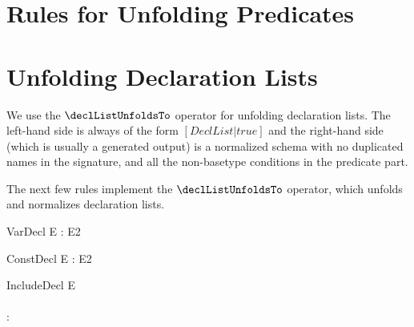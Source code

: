 \documentclass{article}
\begin{document}
\section{Rules for Unfolding Predicates}



\section{Unfolding Declaration Lists}

We use the $\declListUnfoldsTo$ operator for unfolding declaration
lists.   The left-hand side is always of the form $[DeclList|true]$
and the right-hand side (which is usually a generated output) is
a normalized schema with no duplicated names in the signature, and
all the non-basetype conditions in the predicate part.

The next few rules implement the $\declListUnfoldsTo$ operator,
which unfolds and normalizes declaration lists.

\begin{zedrule}{VarDecl}
   \proviso E : \power E2 \\
   [D1 | true] \declListUnfoldsTo [D2 | P2]
\derives
   [v:E; D1 | true] \declListUnfoldsTo [v:E2; D2 |  v \in E \land P2]
\end{zedrule}

\begin{zedrule}{ConstDecl}
   \proviso E : E2 \\
   [D1 | true] \declListUnfoldsTo [D2 | P2]
\derives
   [v==E; D1 | true] \declListUnfoldsTo [v:E2; D2 |  v = E \land P2]
\end{zedrule}

\begin{zedrule}{IncludeDecl}
   E \sexprUnfoldsTo [D1 | P1] \\
   [D | true] \declListUnfoldsTo [D2 | P2] \\
   \proviso [D1 | true] \land [D2 | true] : \power [D3]
\derives
   [E; D | true] \declListUnfoldsTo [D3 |  P1 \land P2]
\end{zedrule}
\end{document}
